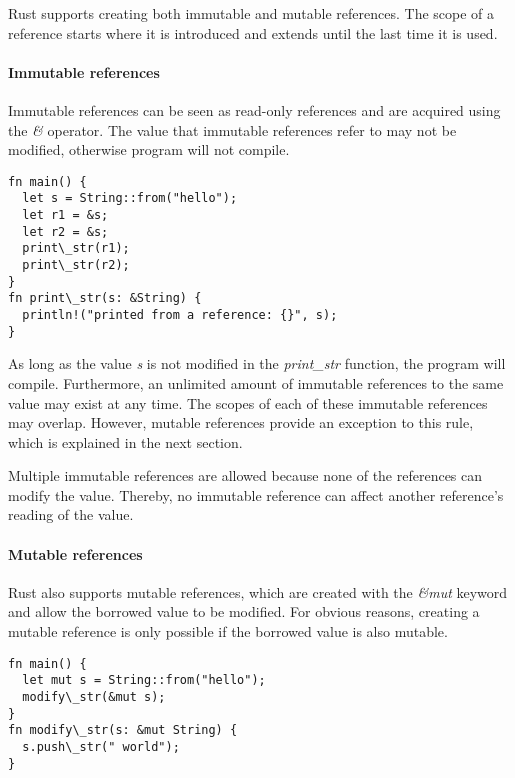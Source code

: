 \documentclass[sigplan,11pt,nonacm]{acmart}
\begin{document}
Rust supports creating both immutable and mutable references.
The scope of a reference starts where it is introduced and extends until the last time it is used.

\paragraph{Immutable references}

Immutable references can be seen as read-only references and are acquired using the \emph{\&} operator.
The value that immutable references refer to may not be modified, otherwise program will not compile.

\begin{lstlisting}
fn main() {
  let s = String::from("hello");
  let r1 = &s;
  let r2 = &s;
  print\_str(r1);
  print\_str(r2);
}
fn print\_str(s: &String) {
  println!("printed from a reference: {}", s);
}
\end{lstlisting}

As long as the value \emph{s} is not modified in the \emph{print\_str} function, the program will compile.
Furthermore, an unlimited amount of immutable references to the same value may exist at any time.
The scopes of each of these immutable references may overlap.
However, mutable references provide an exception to this rule, which is explained in the next section.

Multiple immutable references are allowed because none of the references can modify the value.
Thereby, no immutable reference can affect another reference's reading of the value.


\paragraph{Mutable references}

Rust also supports mutable references, which are created with the \emph{&mut} keyword and allow the borrowed value to be modified.
For obvious reasons, creating a mutable reference is only possible if the borrowed value is also mutable.

\begin{lstlisting}
fn main() {
  let mut s = String::from("hello");
  modify\_str(&mut s);
}
fn modify\_str(s: &mut String) {
  s.push\_str(" world");
}
\end{lstlisting}
\end{document}
